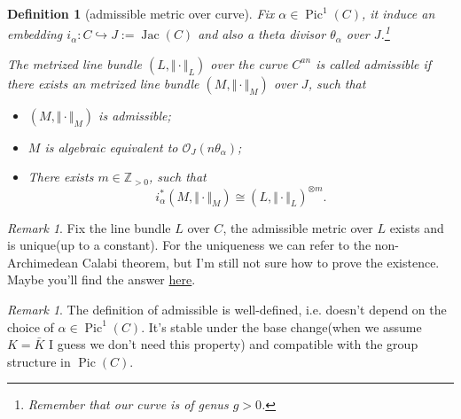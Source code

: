 \documentclass[reqno,11pt]{amsart}
\numberwithin{equation}{section}
\theoremstyle{plain}
\newtheorem{defn}[theorem]{Definition}
\theoremstyle{plain}
\numberwithin{equation}{section}
\theoremstyle{remark}
\newtheorem{remark}[theorem]{Remark}
\DeclareMathOperator{\Pic}{\operatorname{Pic}}
\DeclareMathOperator{\Jac}{\operatorname{Jac}}
\newcommand{\norm}[1]{\Vert{#1}\Vert}
\begin{document}
\begin{defn}[admissible metric over curve]
Fix $\alpha \in \Pic^1(C)$, it induce an embedding $i_{\alpha}:C \hookrightarrow J:=\Jac(C)$ and also a theta divisor $\theta_{\alpha}$ over $J$.\footnote{Remember that our curve is of genus $g>0$.} 

The metrized line bundle $(L,\norm{\cdot}_L)$ over the curve $C^{an}$ is called admissible if there exists an metrized line bundle $(M,\norm{\cdot}_M)$ over $J$, such that 
\begin{itemize}
\item $(M,\norm{\cdot}_M)$ is admissible;
\item $M$ is algebraic equivalent to $\mathcal{O}_J(n\theta_{\alpha})$;
\item There exists $m \in \mathbb{Z}_{>0}$, such that $$i_{\alpha}^*(M,\norm{\cdot}_M) \cong (L,\norm{\cdot}_L)^{\otimes m}.$$
\end{itemize}
\end{defn}
\begin{center}
\end{center}
\begin{remark}
Fix the line bundle $L$ over $C$, the admissible metric over $L$ exists and is unique(up to a constant). For the uniqueness we can refer to the non-Archimedean Calabi theorem, but I'm still not sure how to prove the existence. Maybe you'll find the answer \href{http://qirui.li/main.pdf}{here}.
\end{remark}
\begin{remark}
The definition of admissible is well-defined, i.e. doesn't depend on the choice of $\alpha \in \Pic^1(C)$. It's stable under the base change(when we assume $K=\bar{K}$ I guess we don't need this property) and compatible with the group structure in $\Pic(C)$.
\end{remark}
\end{document}
